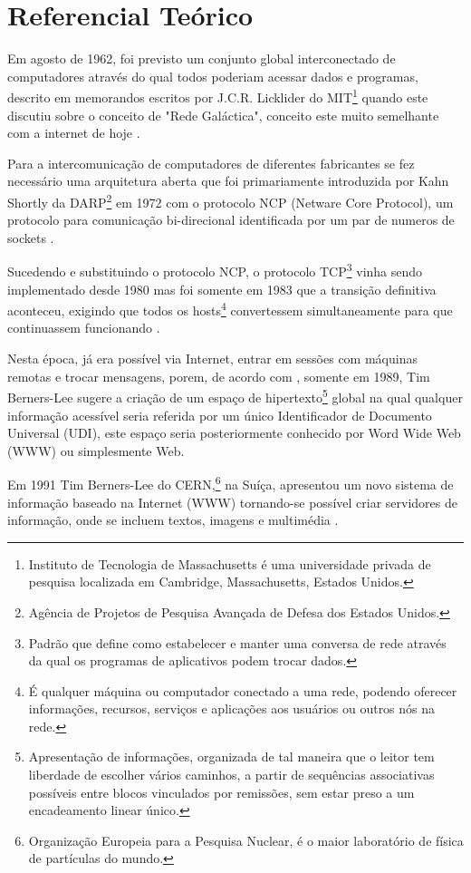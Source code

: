 \section{Referencial Teórico}

Em agosto de 1962, foi previsto um conjunto global interconectado de computadores através do qual todos poderiam acessar dados e programas, descrito em memorandos escritos por J.C.R. Licklider do MIT\footnote{Instituto de Tecnologia de Massachusetts é uma universidade privada de pesquisa localizada em Cambridge, Massachusetts, Estados Unidos.} quando este discutiu sobre o conceito de "Rede Galáctica", conceito este muito semelhante com a internet de hoje \citep[p.~2]{Leiner2009}.

Para a intercomunicação de computadores de diferentes fabricantes se fez necessário uma arquitetura aberta que foi primariamente introduzida por Kahn Shortly da DARP\footnote{Agência de Projetos de Pesquisa Avançada de Defesa dos Estados Unidos.} em 1972 com o protocolo NCP (Netware Core Protocol), um protocolo para comunicação bi-direcional identificada por um par de numeros de sockets \citep[p.~4]{Leiner2009}.

Sucedendo e substituindo o protocolo NCP, o protocolo TCP\footnote{Padrão que define como estabelecer e manter uma conversa de rede através da qual os programas de aplicativos podem trocar dados.} vinha sendo implementado desde 1980 mas foi somente em 1983 que a transição definitiva aconteceu, exigindo que todos os hosts\footnote{É qualquer máquina ou computador conectado a uma rede, podendo oferecer informações, recursos, serviços e aplicações aos usuários ou outros nós na rede.} convertessem simultaneamente para que continuassem funcionando \citep[p.~7]{Leiner2009}.

Nesta época, já era possível via Internet, entrar em sessões com máquinas remotas e trocar mensagens, porem, de acordo com \citet{Aghaei2012}, somente em 1989, Tim Berners-Lee sugere a criação de um espaço de hipertexto\footnote{Apresentação de informações, organizada de tal maneira que o leitor tem liberdade de escolher vários caminhos, a partir de sequências associativas possíveis entre blocos vinculados por remissões, sem estar preso a um encadeamento linear único.} global na qual qualquer informação acessível seria referida por um único Identificador de Documento Universal (UDI), este espaço seria posteriormente conhecido por Word Wide Web (WWW) ou simplesmente Web.

Em 1991 Tim Berners-Lee do CERN,\footnote{Organização Europeia para a Pesquisa Nuclear, é o maior laboratório de física de partículas do mundo.} na Suíça, apresentou um novo sistema de informação baseado na Internet (WWW) tornando-se possível criar servidores de informação, onde se incluem textos, imagens e multimédia \citep{goethals2000historia}.

